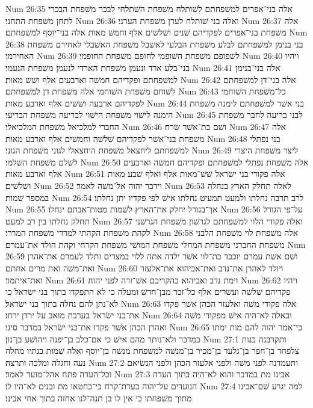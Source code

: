 Num 26:35  אלה בני־אפרים למשׁפחתם לשׁותלח משׁפחת השׁתלחי לבכר משׁפחת הבכרי לתחן משׁפחת התחני׃
Num 26:36  ואלה בני שׁותלח לערן משׁפחת הערני׃
Num 26:37  אלה משׁפחת בני־אפרים לפקדיהם שׁנים ושׁלשׁים אלף וחמשׁ מאות אלה בני־יוסף למשׁפחתם׃
Num 26:38  בני בנימן למשׁפחתם לבלע משׁפחת הבלעי לאשׁבל משׁפחת האשׁבלי לאחירם משׁפחת האחירמי׃
Num 26:39  לשׁפופם משׁפחת השׁופמי לחופם משׁפחת החופמי׃
Num 26:40  ויהיו בני־בלע ארד ונעמן משׁפחת הארדי לנעמן משׁפחת הנעמי׃
Num 26:41  אלה בני־בנימן למשׁפחתם ופקדיהם חמשׁה וארבעים אלף ושׁשׁ מאות׃
Num 26:42  אלה בני־דן למשׁפחתם לשׁוחם משׁפחת השׁוחמי אלה משׁפחת דן למשׁפחתם׃
Num 26:43  כל־משׁפחת השׁוחמי לפקדיהם ארבעה ושׁשׁים אלף וארבע מאות׃
Num 26:44  בני אשׁר למשׁפחתם לימנה משׁפחת הימנה לישׁוי משׁפחת הישׁוי לבריעה משׁפחת הבריעי׃
Num 26:45  לבני בריעה לחבר משׁפחת החברי למלכיאל משׁפחת המלכיאלי׃
Num 26:46  ושׁם בת־אשׁר שׂרח׃
Num 26:47  אלה משׁפחת בני־אשׁר לפקדיהם שׁלשׁה וחמשׁים אלף וארבע מאות׃
Num 26:48  בני נפתלי למשׁפחתם ליחצאל משׁפחת היחצאלי לגוני משׁפחת הגוני׃
Num 26:49  ליצר משׁפחת היצרי לשׁלם משׁפחת השׁלמי׃
Num 26:50  אלה משׁפחת נפתלי למשׁפחתם ופקדיהם חמשׁה וארבעים אלף וארבע מאות׃
Num 26:51  אלה פקודי בני ישׂראל שׁשׁ־מאות אלף ואלף שׁבע מאות ושׁלשׁים׃
Num 26:52  וידבר יהוה אל־משׁה לאמר׃
Num 26:53  לאלה תחלק הארץ בנחלה במספר שׁמות׃
Num 26:54  לרב תרבה נחלתו ולמעט תמעיט נחלתו אישׁ לפי פקדיו יתן נחלתו׃
Num 26:55  אך־בגורל יחלק את־הארץ לשׁמות מטות־אבתם ינחלו׃
Num 26:56  על־פי הגורל תחלק נחלתו בין רב למעט׃
Num 26:57  ואלה פקודי הלוי למשׁפחתם לגרשׁון משׁפחת הגרשׁני לקהת משׁפחת הקהתי למררי משׁפחת המררי׃
Num 26:58  אלה משׁפחת לוי משׁפחת הלבני משׁפחת החברני משׁפחת המחלי משׁפחת המושׁי משׁפחת הקרחי וקהת הולד את־עמרם׃
Num 26:59  ושׁם אשׁת עמרם יוכבד בת־לוי אשׁר ילדה אתה ללוי במצרים ותלד לעמרם את־אהרן ואת־משׁה ואת מרים אחתם׃
Num 26:60  ויולד לאהרן את־נדב ואת־אביהוא את־אלעזר ואת־איתמר׃
Num 26:61  וימת נדב ואביהוא בהקריבם אשׁ־זרה לפני יהוה׃
Num 26:62  ויהיו פקדיהם שׁלשׁה ועשׂרים אלף כל־זכר מבן־חדשׁ ומעלה כי לא התפקדו בתוך בני ישׂראל כי לא־נתן להם נחלה בתוך בני ישׂראל׃
Num 26:63  אלה פקודי משׁה ואלעזר הכהן אשׁר פקדו את־בני ישׂראל בערבת מואב על ירדן ירחו׃
Num 26:64  ובאלה לא־היה אישׁ מפקודי משׁה ואהרן הכהן אשׁר פקדו את־בני ישׂראל במדבר סיני׃
Num 26:65  כי־אמר יהוה להם מות ימתו במדבר ולא־נותר מהם אישׁ כי אם־כלב בן־יפנה ויהושׁע בן־נון׃
Num 27:1  ותקרבנה בנות צלפחד בן־חפר בן־גלעד בן־מכיר בן־מנשׁה למשׁפחת מנשׁה בן־יוסף ואלה שׁמות בנתיו מחלה נעה וחגלה ומלכה ותרצה׃
Num 27:2  ותעמדנה לפני משׁה ולפני אלעזר הכהן ולפני הנשׂיאם וכל־העדה פתח אהל־מועד לאמר׃
Num 27:3  אבינו מת במדבר והוא לא־היה בתוך העדה הנועדים על־יהוה בעדת־קרח כי־בחטאו מת ובנים לא־היו לו׃
Num 27:4  למה יגרע שׁם־אבינו מתוך משׁפחתו כי אין לו בן תנה־לנו אחזה בתוך אחי אבינו׃
